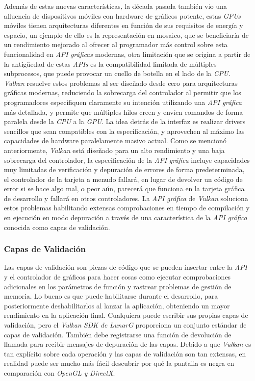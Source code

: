 \documentclass[a4paper]{book}
\begin{document}
Además de estas nuevas características, la década pasada también vio una afluencia de dispositivos
móviles con hardware de gráficos potente, estas \textit{GPUs} móviles tienen arquitecturas diferentes en función de sus requisitos de
energía y espacio, un ejemplo de ello es la representación en mosaico, que se beneficiaría de un rendimiento mejorado al ofrecer al
programador más control sobre esta funcionalidad en \textit{API gráficas} modernas, otra limitación que se origina a partir de la antigüedad
de estas \textit{APIs} es la compatibilidad limitada de múltiples subprocesos, que puede provocar un cuello de botella en el lado de la
\textit{CPU}. \textit{Vulkan} resuelve estos problemas al ser diseñado desde cero para arquitecturas gráficas modernas, reduciendo la sobrecarga
del controlador al permitir que los programadores especifiquen claramente su intención utilizando una \textit{API gráfica} más detallada,
y permite que múltiples hilos creen y envíen comandos de forma paralela desde la \textit{CPU} a la \textit{GPU}. La idea detrás de la interfaz
es realizar drivers sencillos que sean compatibles con la especificación, y aprovechen al máximo las capacidades de hardware paralelamente
masivo actual. Como se mencionó anteriormente, \textit{Vulkan} está diseñado para un alto rendimiento y una baja sobrecarga del controlador, la 
especificación de la \textit{API gráfica} incluye capacidades muy limitadas de verificación y depuración de errores de forma predeterminada,
el controlador de la tarjeta a menudo fallará, en lugar de devolver un código de error si se hace algo mal, o peor aún, parecerá que
funciona en la tarjeta gráfica de desarrollo y fallará en otros controladores. La \textit{API gráfica} de \textit{Vulkan} soluciona estos problemas 
habilitando extensas comprobaciones en tiempo de compilación y en ejecución en modo depuración a través de una característica de la 
\textit{API gráfica} conocida como capas de validación.

\subsubsection{Capas de Validación}
\label{subsec:CapsVulkan}

Las capas de validación son piezas de código que se pueden insertar entre la \textit{API} y el controlador de gráficos
para hacer cosas como ejecutar comprobaciones adicionales en los parámetros de función y rastrear problemas
de gestión de memoria. Lo bueno es que puede habilitarse durante el desarrollo, para posteriormente deshabilitarlos
al lanzar la aplicación, obteniendo un mayor rendimiento en la aplicación final. Cualquiera puede escribir sus propias capas de validación,
pero el \textit{Vulkan SDK de LunarG} proporciona un conjunto estándar de capas de validación. También debe registrarse
una función de devolución de llamada para recibir mensajes de depuración de las capas. Debido a que \textit{Vulkan} es tan explícito
sobre cada operación y las capas de validación son tan extensas, en realidad puede ser mucho más fácil descubrir por qué la pantalla
es negra en comparación con \textit{OpenGL y DirectX}.
\end{document}
